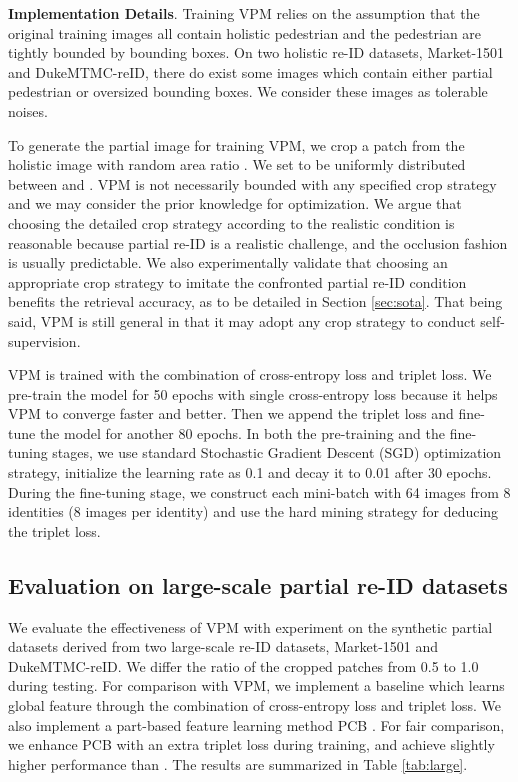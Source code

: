\documentclass[10pt,twocolumn,letterpaper]{article}
\begin{document}
\textbf{Implementation Details}. 
Training VPM relies on the assumption that the original training images all contain holistic pedestrian and the pedestrian are tightly bounded by bounding boxes. On two holistic re-ID datasets, Market-1501 and DukeMTMC-reID, there do exist some images which contain either partial pedestrian or oversized bounding boxes. We consider these images as tolerable noises. 

To generate the partial image for training VPM, we crop a patch from the holistic image with random area ratio . We set  to be uniformly distributed between  and . VPM is not necessarily bounded with any specified crop strategy and we may consider the prior knowledge for optimization. We argue that choosing the detailed crop strategy according to the realistic condition is reasonable because partial re-ID is a realistic challenge, and the occlusion fashion is usually predictable. We also experimentally validate that choosing an appropriate crop strategy to imitate the confronted partial re-ID condition benefits the retrieval accuracy, as to be detailed in Section \ref{sec:sota}. That being said, VPM is still general in that it may adopt any crop strategy to conduct self-supervision. 

VPM is trained with the combination of cross-entropy loss and triplet loss. We pre-train the model for 50 epochs with single cross-entropy loss because it helps VPM to converge faster and better. Then we append the triplet loss and fine-tune the model for another 80 epochs. In both the pre-training and the fine-tuning stages, we use standard Stochastic Gradient Descent (SGD) optimization strategy, initialize the learning rate as 0.1 and decay it to 0.01 after 30 epochs. During the fine-tuning stage, we construct each mini-batch with 64 images from 8 identities (8 images per identity) and use the hard mining strategy \cite{Hermans2017DefenseTriplet} for deducing the triplet loss. 





\subsection{Evaluation on large-scale partial re-ID datasets}\label{sec:largedata}
We evaluate the effectiveness of VPM with experiment on the synthetic partial datasets derived from two large-scale re-ID datasets, Market-1501 and DukeMTMC-reID. We differ the ratio  of the cropped patches from 0.5 to 1.0 during testing. For comparison with VPM, we implement a baseline which learns global feature through the combination of cross-entropy loss and triplet loss. We also implement a part-based feature learning method PCB \cite{PCB_ECCV}. For fair comparison, we enhance PCB with an extra triplet loss during training, and achieve slightly higher performance than \cite{PCB_ECCV}. The results are summarized in Table \ref{tab:large}.
\end{document}
